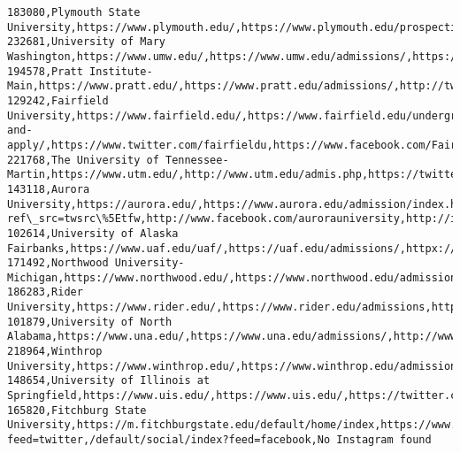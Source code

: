 \documentclass[11pt]{article}
\begin{document}
\begin{Verbatim}[commandchars=\\\{\}]
183080,Plymouth State University,https://www.plymouth.edu/,https://www.plymouth.edu/prospective/undergraduate/undergraduate/admissions/,https://www.twitter.com/PlymouthState,https://www.facebook.com/PlymouthState,https://www.instagram.com/PlymouthState
232681,University of Mary Washington,https://www.umw.edu/,https://www.umw.edu/admissions/,https://twitter.com/marywash/,https://www.facebook.com/UniversityofMaryWashington,https://www.instagram.com/marywash/
194578,Pratt Institute-Main,https://www.pratt.edu/,https://www.pratt.edu/admissions/,http://twitter.com/prattinstitute,http://facebook.com/prattinstitute,http://instagram.com/prattinstitute
129242,Fairfield University,https://www.fairfield.edu/,https://www.fairfield.edu/undergraduate/visit-and-apply/,https://www.twitter.com/fairfieldu,https://www.facebook.com/FairfieldUniversity,https://www.instagram.com/fairfieldu
221768,The University of Tennessee-Martin,https://www.utm.edu/,http://www.utm.edu/admis.php,https://twitter.com/utmartin,https://www.facebook.com/utmartin,http://instagram.com/utmartin
143118,Aurora University,https://aurora.edu/,https://www.aurora.edu/admission/index.html\#.W9U3OeIpC00,https://twitter.com/AuroraU?ref\_src=twsrc\%5Etfw,http://www.facebook.com/aurorauniversity,http://instagram.com/aurorauniversity\#
102614,University of Alaska Fairbanks,https://www.uaf.edu/uaf/,https://uaf.edu/admissions/,httpx://twitter.com/uafairbanks/,https://www.facebook.com/uafairbanks/,https://instagram.com/uafairbanks/
171492,Northwood University-Michigan,https://www.northwood.edu/,https://www.northwood.edu/admissions,http://twitter.com/northwoodu,http://facebook.com/northwoodu,https://www.instagram.com/northwoodu
186283,Rider University,https://www.rider.edu/,https://www.rider.edu/admissions,https://twitter.com/RiderUniversity,https://www.facebook.com/RiderUniversity,https://www.instagram.com/p/BpPeTCdnHfF/
101879,University of North Alabama,https://www.una.edu/,https://www.una.edu/admissions/,http://www.twitter.com/north\_alabama,http://www.facebook.com/northalabama,https://www.instagram.com/north\_alabama
218964,Winthrop University,https://www.winthrop.edu/,https://www.winthrop.edu/admissions/,http://twitter.com/winthropu,http://www.facebook.com/Winthrop.University,http://instagram.com/winthropu
148654,University of Illinois at Springfield,https://www.uis.edu/,https://www.uis.edu/,https://twitter.com/UISedu,https://www.facebook.com/uis.edu,https://www.instagram.com/uisedu/
165820,Fitchburg State University,https://m.fitchburgstate.edu/default/home/index,https://www.fitchburgstate.edu/admissions/,/default/social/index?feed=twitter,/default/social/index?feed=facebook,No Instagram found

\end{Verbatim}
\end{document}
